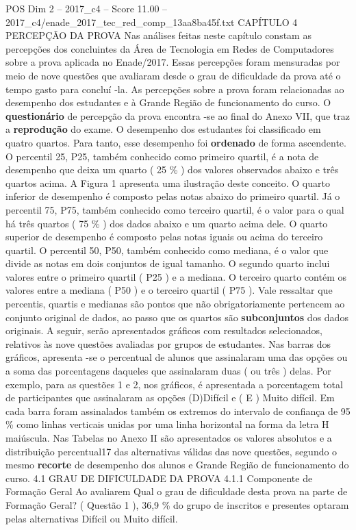 \begin{textsample}{POS Dim 2 – 2017\_c4 – Score 11.00 – 2017\_c4/enade\_2017\_tec\_red\_comp\_13aa8ba45f.txt}  \label{ex:f2_pos_098}
CAPÍTULO 4 PERCEPÇÃO DA PROVA Nas análises feitas neste capítulo constam as percepções dos concluintes da Área de Tecnologia em Redes de Computadores sobre a prova aplicada no Enade/2017.
Essas percepções foram mensuradas por meio de nove questões que avaliaram desde o grau de dificuldade da prova até o tempo gasto para concluí -la.
As percepções sobre a prova foram relacionadas ao desempenho dos estudantes e à Grande Região de funcionamento do curso.
O \textbf{questionário} de percepção da prova encontra -se ao final do Anexo VII, que traz a \textbf{reprodução} do exame.
O desempenho dos estudantes foi classificado em quatro quartos.
Para tanto, esse desempenho foi \textbf{ordenado} de forma ascendente.
O percentil 25, P25, também conhecido como primeiro quartil, é a nota de desempenho que deixa um quarto ( 25 \% ) dos valores observados abaixo e três quartos acima.
A Figura 1 apresenta uma ilustração deste conceito.
O quarto inferior de desempenho é composto pelas notas abaixo do primeiro quartil.
Já o percentil 75, P75, também conhecido como terceiro quartil, é o valor para o qual há três quartos ( 75 \% ) dos dados abaixo e um quarto acima dele.
O quarto superior de desempenho é composto pelas notas iguais ou acima do terceiro quartil.
O percentil 50, P50, também conhecido como mediana, é o valor que divide as notas em dois conjuntos de igual tamanho.
O segundo quarto inclui valores entre o primeiro quartil ( P25 ) e a mediana.
O terceiro quarto contém os valores entre a mediana ( P50 ) e o terceiro quartil ( P75 ).
Vale ressaltar que percentis, quartis e medianas são pontos que não obrigatoriamente pertencem ao conjunto original de dados, ao passo que os quartos são \textbf{subconjuntos} dos dados originais.
A seguir, serão apresentados gráficos com resultados selecionados, relativos às nove questões avaliadas por grupos de estudantes.
Nas barras dos gráficos, apresenta -se o percentual de alunos que assinalaram uma das opções ou a soma das porcentagens daqueles que assinalaram duas ( ou três ) delas.
Por exemplo, para as questões 1 e 2, nos gráficos, é apresentada a porcentagem total de participantes que assinalaram as opções (D)Difícil e ( E ) Muito difícil.
Em cada barra foram assinalados também os extremos do intervalo de confiança de 95 \% como linhas verticais unidas por uma linha horizontal na forma da letra H maiúscula.
Nas Tabelas no Anexo II são apresentados os valores absolutos e a distribuição percentual17 das alternativas válidas das nove questões, segundo o mesmo \textbf{recorte} de desempenho dos alunos e Grande Região de funcionamento do curso. 4.1 GRAU DE DIFICULDADE DA PROVA 4.1.1 Componente de Formação Geral Ao avaliarem Qual o grau de dificuldade desta prova na parte de Formação Geral? ( Questão 1 ), 36,9 \% do grupo de inscritos e presentes optaram pelas alternativas Difícil ou Muito difícil.

\end{textsample}
